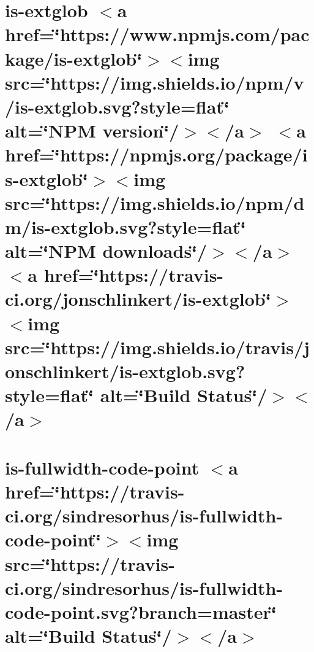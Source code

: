 \let\mypdfximage\pdfximage\def\pdfximage{\immediate\mypdfximage}\documentclass[twoside]{book}
\newcommand{\+}{\discretionary{\mbox{\scriptsize$\hookleftarrow$}}{}{}}
\begin{document}
\chapter{is-\/extglob $<$a href=\char`\"{}https\+://www.\+npmjs.\+com/package/is-\/extglob\char`\"{}$>$$<$img src=\char`\"{}https\+://img.\+shields.\+io/npm/v/is-\/extglob.\+svg?style=flat\char`\"{} alt=\char`\"{}\+N\+P\+M version\char`\"{}/$>$$<$/a$>$ $<$a href=\char`\"{}https\+://npmjs.\+org/package/is-\/extglob\char`\"{}$>$$<$img src=\char`\"{}https\+://img.\+shields.\+io/npm/dm/is-\/extglob.\+svg?style=flat\char`\"{} alt=\char`\"{}\+N\+P\+M downloads\char`\"{}/$>$$<$/a$>$ $<$a href=\char`\"{}https\+://travis-\/ci.\+org/jonschlinkert/is-\/extglob\char`\"{}$>$$<$img src=\char`\"{}https\+://img.\+shields.\+io/travis/jonschlinkert/is-\/extglob.\+svg?style=flat\char`\"{} alt=\char`\"{}\+Build Status\char`\"{}/$>$$<$/a$>$}
\label{md__c_1__git_hub__p_r_o_y_e_c_t_o-_i_i_i-_g_o_t_rest-api_node_modules_is-extglob__r_e_a_d_m_e}

\chapter{is-\/fullwidth-\/code-\/point $<$a href=\char`\"{}https\+://travis-\/ci.\+org/sindresorhus/is-\/fullwidth-\/code-\/point\char`\"{}$>$$<$img src=\char`\"{}https\+://travis-\/ci.\+org/sindresorhus/is-\/fullwidth-\/code-\/point.\+svg?branch=master\char`\"{} alt=\char`\"{}\+Build Status\char`\"{}/$>$$<$/a$>$}
\label{md__c_1__git_hub__p_r_o_y_e_c_t_o-_i_i_i-_g_o_t_rest-api_node_modules_is-fullwidth-code-point_readme}

\end{document}
